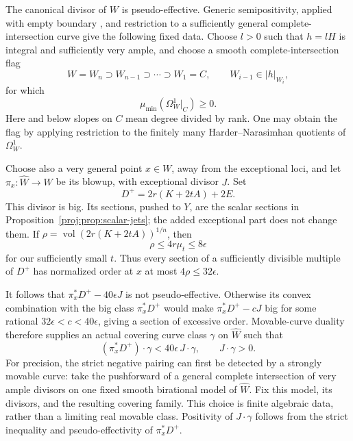 \documentclass[11pt,letterpaper]{article}
\theoremstyle{definition}
\theoremstyle{remark}
\begin{document}
The canonical divisor of \(W\) is pseudo-effective. Generic
semipositivity, applied with empty boundary
\cite[Theorem~2.1]{Proj-CampanaPaun2015}, and restriction to a sufficiently
general complete-intersection curve give the following fixed data.
Choose \(l>0\) such that \(h=lH\) is integral and sufficiently very
ample, and choose a smooth complete-intersection flag
\[
 W=W_n\supset W_{n-1}\supset\cdots\supset W_1=C,
 \qquad W_{i-1}\in |h|_{W_i},
\]
for which
\begin{equation}
\label{proj:fr:generic-nef}
 \mu_{\min}(\Omega_W^1|_C)\geq0.
\end{equation}
Here and below slopes on \(C\) mean degree divided by rank. One may
obtain the flag by applying restriction to the finitely many
Harder--Narasimhan quotients of \(\Omega_W^1\).

Choose also a very general point \(x\in W\), away from the exceptional
loci, and let \(\pi_x:\widehat W\to W\) be its blowup, with exceptional
divisor \(J\). Set
\[
 D^+=2r(K+2tA)+2E.
\]
This divisor is big. Its sections, pushed to \(Y\), are the scalar
sections in Proposition~\ref{proj:prop:scalar-jets}; the added exceptional
part does not change them. If
\(\rho=\operatorname{vol}(2r(K+2tA))^{1/n}\), then
\[
 \rho\leq4r\mu_t\leq8\epsilon
\]
for our sufficiently small \(t\). Thus every section of a sufficiently
divisible multiple of \(D^+\) has normalized order at \(x\) at most
\(4\rho\leq32\epsilon\).

It follows that \(\pi_x^*D^+-40\epsilon J\) is not pseudo-effective.
Otherwise its convex combination with the big class \(\pi_x^*D^+\)
would make \(\pi_x^*D^+-cJ\) big for some rational
\(32\epsilon<c<40\epsilon\), giving a section of excessive order.
Movable-curve duality \cite[Theorem~2.2]{BDPP} therefore supplies an
actual covering curve class \(\gamma\) on \(\widehat W\) such that
\begin{equation}
\label{proj:fr:curve-test}
 (\pi_x^*D^+)\cdot\gamma
       <40\epsilon\,J\cdot\gamma,\qquad J\cdot\gamma>0.
\end{equation}
For precision, the strict negative pairing can first be detected by a
strongly movable curve: take the pushforward of a general complete
intersection of very ample divisors on one fixed smooth birational
model of \(\widehat W\). Fix this model, its divisors, and the resulting
covering family. This choice is finite algebraic data, rather than a
limiting real movable class. Positivity of \(J\cdot\gamma\) follows
from the strict inequality and pseudo-effectivity of \(\pi_x^*D^+\).
\end{document}
